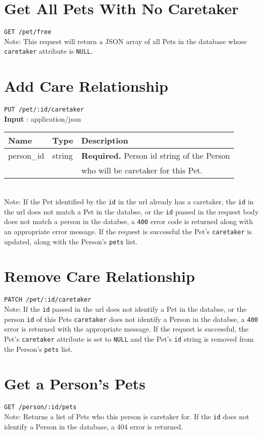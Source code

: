 \documentclass{article}
\begin{document}
\section*{Get All Pets With No Caretaker}
\texttt{GET /pet/free} \\
Note: This request will return a JSON array of all Pets in the database whose
\texttt{caretaker} attribute is \texttt{NULL}.

\section*{Add Care Relationship}
\texttt{PUT /pet/:id/caretaker} \\
\textbf{Input} : application/json \\
\begin{tabular}{| l | l | l |}
	\hline
	\textbf{Name} & \textbf{Type} & \textbf{Description} \\
	\hline
	person\_id   & string         & \textbf{Required.} Person id string of the Person \\
		     &                & who will be caretaker for this Pet. \\
	\hline
\end{tabular} \\
Note: If the Pet identified by the \texttt{id} in the url already has a caretaker,
the \texttt{id} in the url does not match a Pet in the databse, or the \texttt{id}
passed in the request body does not match a person in the databse, a \texttt{400} error code
is returned along with an appropriate error message. If the request is successful the Pet's
\texttt{caretaker} is updated, along with the Person's \texttt{pets} list.

\section*{Remove Care Relationship}
\texttt{PATCH /pet/:id/caretaker} \\
Note: If the \texttt{id} passed in the url does not identify a Pet in the databse,
or the person \texttt{id} of this Pets \texttt{caretaker} does not identify a Person
in the databse, a \texttt{400} error is returned with the appropriate message.
If the request is successful, the Pet's \texttt{caretaker} attribute is set to
\texttt{NULL} and the Pet's \texttt{id} string is removed from the Person's
\texttt{pets} list.

\section*{Get a Person's Pets}
\texttt{GET /person/:id/pets} \\
Note: Returns a list of Pets who this person is caretaker for. If the \texttt{id}
does not identify a Person in the database, a 404 error is returned.
\end{document}
